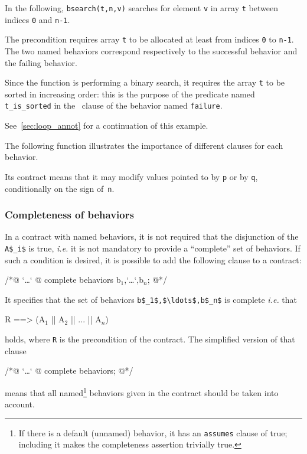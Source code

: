 \begin{example}
\label{ex:bsearch}
In the following, \lstinline|bsearch(t,n,v)| searches for element \lstinline|v|
in array \lstinline|t| between indices \lstinline|0| and \lstinline|n-1|.

%
The precondition requires array \lstinline|t| to be allocated at least
from indices \lstinline|0|
to \lstinline|n-1|. The two named behaviors
correspond respectively to the successful behavior and the failing
behavior.

Since the function is performing a binary search, it requires the
array \lstinline|t| to be sorted in increasing order: this is the purpose of
the predicate named \lstinline|t_is_sorted| in the \assumes\ clause of the
behavior named \lstinline|failure|.

See~\ref{sec:loop_annot} for a continuation of this example.
\end{example}

\begin{example}
  The following function illustrates the importance of different
  \assigns{} clauses for each behavior.

%
  Its contract means that it may modify values pointed to by
  \lstinline|p| or by \lstinline|q|,
  conditionally on the sign of~\lstinline|n|.
\end{example}


\subsubsection{Completeness of behaviors}
\label{sec:compl-behav}
In a contract with named behaviors, it is not required that
the disjunction of the \lstinline|A$_i$| is true, \emph{i.e.} it is not 
mandatory to provide a ``complete'' set of behaviors.
If such a condition is desired, it is possible to add the following clause
to a contract:
\begin{listing-nonumber}
/*@ `\dots`
  @ complete behaviors b$_1$,`\dots`,b$_n$;
  @*/
\end{listing-nonumber}
It specifies that the set of behaviors \lstinline|b$_1$,$\ldots$,b$_n$| 
is complete \emph{i.e.} that
\begin{listing-nonumber}
R ==> (A$_1$ || A$_2$ || ... || A$_n$)
\end{listing-nonumber}
holds, where \lstinline|R| is the precondition of the contract.
The simplified version of that clause
\begin{listing-nonumber}
/*@ `\dots`
  @ complete behaviors;
  @*/
\end{listing-nonumber}
means that all named\footnote{If there is a default (unnamed) behavior, it has an 
	\lstinline|assumes| clause of true; including it makes the 
	completeness assertion trivially true.} behaviors given in the contract should be taken into account.

